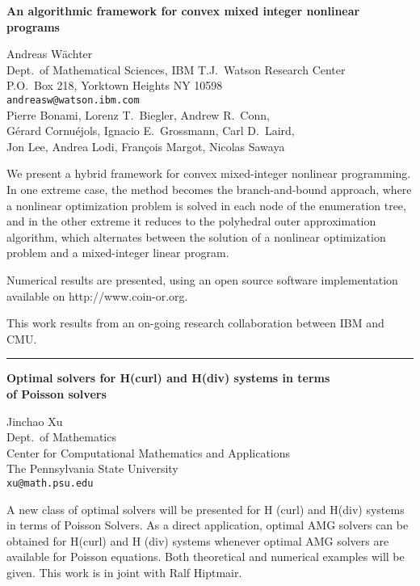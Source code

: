 \documentclass[twosided]{report}
\begin{document}
\begin{center}
{\large			%
{\bf An algorithmic framework for convex mixed integer nonlinear programs}}

	Andreas W\"achter \\
	Dept.~of Mathematical Sciences, IBM T.J.~Watson Research Center \\
	P.O.~Box 218, Yorktown Heights NY 10598 \\
	{\tt andreasw@watson.ibm.com} \\
	Pierre Bonami, Lorenz T.~Biegler, Andrew R.~Conn, \\
	G\'erard Cornu\'ejols, Ignacio E.~Grossmann, Carl D.~Laird, \\
	Jon Lee, Andrea Lodi, Fran\c{c}ois Margot, Nicolas Sawaya
\end{center}
We present a hybrid framework for convex mixed-integer
nonlinear programming. In one extreme case, the method
becomes the branch-and-bound approach, where a nonlinear
optimization problem is solved in each node of the
enumeration tree, and in the other extreme it reduces to the
polyhedral outer approximation algorithm, which alternates
between the solution of a nonlinear optimization problem and
a mixed-integer linear program.

Numerical results are
presented, using an open source software implementation
available on http://www.coin-or.org.

This work results
from an on-going research collaboration between IBM and CMU.



	\begin{center} \rule{6in}{1pt} \end{center}

\newpage

\begin{center}
{\large			%
{\bf Optimal solvers for H(curl) and H(div) systems in terms \\
	of Poisson solvers}}

	Jinchao Xu \\
	Dept.~of Mathematics \\
	Center for Computational Mathematics and Applications \\
	The Pennsylvania State University \\
	{\tt xu@math.psu.edu}
\end{center}
A new class of optimal solvers
will be presented for H (curl) and H(div) systems in terms of
Poisson Solvers. As a direct application, optimal AMG solvers can
be obtained for H(curl) and H (div) systems whenever optimal AMG
solvers are available for Poisson equations. Both theoretical and
numerical examples will be given. This work is in joint with Ralf
Hiptmair.
\end{document}
